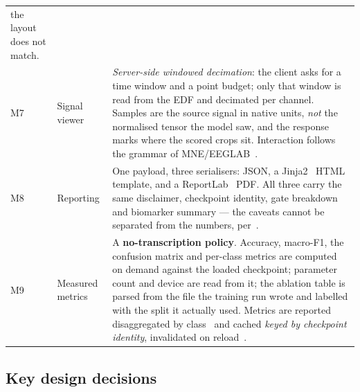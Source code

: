 \documentclass[11pt,a4paper]{article}
\begin{document}
\begin{table}[H]
\begin{tabularx}{\linewidth}{@{}C{0.55cm} L{2.4cm} Y@{}}
the layout does not match. \\
\addlinespace[2pt]
M7 & Signal viewer &
\emph{Server-side windowed decimation}: the client asks for a time window and a
point budget; only that window is read from the EDF and decimated per channel.
Samples are the source signal in native units, \emph{not} the normalised tensor
the model saw, and the response marks where the scored crops sit. Interaction
follows the grammar of MNE/EEGLAB~\cite{gramfort2013,delorme2004}. \\
\addlinespace[2pt]
M8 & Reporting &
One payload, three serialisers: JSON, a Jinja2~\cite{jinja} HTML template, and a
ReportLab~\cite{reportlab} PDF. All three carry the same disclaimer, checkpoint
identity, gate breakdown and biomarker summary --- the caveats cannot be
separated from the numbers, per~\cite{sendak2020}. \\
\addlinespace[2pt]
M9 & Measured metrics &
A \textbf{no-transcription policy}. Accuracy, macro-F1, the confusion matrix and
per-class metrics are computed on demand against the loaded checkpoint;
parameter count and device are read from it; the ablation table is parsed from
the file the training run wrote and labelled with the split it actually used.
Metrics are reported disaggregated by class~\cite{mitchell2019} and cached
\emph{keyed by checkpoint identity}, invalidated on reload~\cite{amershi2019}. \\
\bottomrule
\end{tabularx}
\end{table}

\subsection{Key design decisions}
\end{document}
